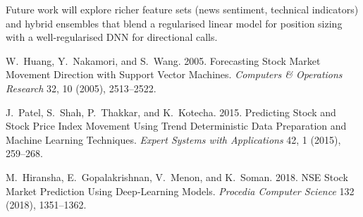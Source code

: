 \documentclass[sigconf]{acmart}
\begin{document}
Future work will explore richer feature sets (news sentiment, technical indicators) and hybrid ensembles that blend a regularised linear model for position sizing with a well‑regularised DNN for directional calls.


\begin{thebibliography}{9}
  W.~Huang, Y.~Nakamori, and S.~Wang. 2005.
  Forecasting Stock Market Movement Direction with Support Vector Machines.
  \emph{Computers \& Operations Research} 32, 10 (2005), 2513--2522.

  J.~Patel, S.~Shah, P.~Thakkar, and K.~Kotecha. 2015.
  Predicting Stock and Stock Price Index Movement Using Trend Deterministic Data Preparation and Machine Learning Techniques.
  \emph{Expert Systems with Applications} 42, 1 (2015), 259--268.

  M.~Hiransha, E.~Gopalakrishnan, V.~Menon, and K.~Soman. 2018.
  NSE Stock Market Prediction Using Deep‑Learning Models.
  \emph{Procedia Computer Science} 132 (2018), 1351--1362.
\end{thebibliography}
\end{document}
